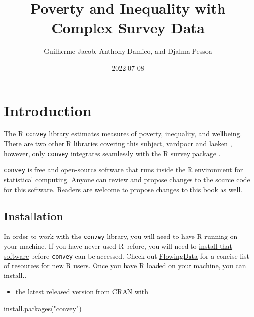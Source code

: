 \documentclass[
]{book}
\title{Poverty and Inequality with Complex Survey Data}
\author{Guilherme Jacob, Anthony Damico, and Djalma Pessoa}
\date{2022-07-08}
\newenvironment{Shaded}{\begin{snugshade}}{\end{snugshade}}
\newcommand{\FunctionTok}[1]{\textcolor[rgb]{0.00,0.00,0.00}{#1}}
\newcommand{\NormalTok}[1]{#1}
\newcommand{\StringTok}[1]{\textcolor[rgb]{0.31,0.60,0.02}{#1}}
\providecommand{\tightlist}{%
  \setlength{\itemsep}{0pt}\setlength{\parskip}{0pt}}
\begin{document}
\maketitle

{
\setcounter{tocdepth}{1}
\tableofcontents
}
\hypertarget{introduction}{%
\chapter{Introduction}\label{introduction}}

The R \texttt{convey} library estimates measures of poverty, inequality, and wellbeing. There are two other R libraries covering this subject, \href{https://CRAN.R-project.org/package=vardpoor}{vardpoor} \autocite{R-vardpoor} and \href{https://CRAN.R-project.org/package=laeken}{laeken} \autocite{R-laeken}, however, only \texttt{convey} integrates seamlessly with the \href{https://CRAN.R-project.org/package=survey}{R survey package} \autocite{R-survey-article,R-survey-book,R-survey}.

\texttt{convey} is free and open-source software that runs inside the \href{https://www.r-project.org/}{R environment for statistical computing}. Anyone can review and propose changes to \href{https://github.com/DjalmaPessoa/convey}{the source code} for this software. Readers are welcome to \href{https://github.com/guilhermejacob/context/}{propose changes to this book} as well.

\hypertarget{install}{%
\section{Installation}\label{install}}

In order to work with the \texttt{convey} library, you will need to have R running on your machine. If you have never used R before, you will need to \href{https://www.r-project.org/}{install that software} before \texttt{convey} can be accessed. Check out \href{http://flowingdata.com/2012/06/04/resources-for-getting-started-with-r/}{FlowingData} for a concise list of resources for new R users. Once you have R loaded on your machine, you can install..

\begin{itemize}
\tightlist
\item
  the latest released version from \href{https://CRAN.R-project.org/package=convey}{CRAN} with
\end{itemize}

\begin{Shaded}
\begin{Highlighting}[]
\FunctionTok{install.packages}\NormalTok{(}\StringTok{"convey"}\NormalTok{)}
\end{Highlighting}
\end{Shaded}
\end{document}
